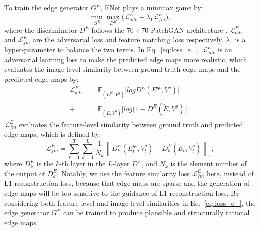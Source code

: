 To train the edge generator $G^E$, ENet plays a minimax game by:
\begin{equation}
	\label{eq:loss_e_}
	\min\limits_{G^E} \max \limits_{D^E} \big(\mathcal{L}^E_{adv}+\lambda_1 \mathcal{L}^E_{fm}\big),
\end{equation}
where the discriminator $D^E$ follows the $70\times 70$ PatchGAN architecture \cite{Isola_2017_CVPR}. 
$\mathcal{L}^E_{adv}$ and $\mathcal{L}^E_{fm}$ are the adversarial loss and feature matching loss respectively. 
$\lambda_1$ is a hyper-parameter to balance the two terms.
%
In Eq.~\eqref{eq:loss_e_}, $\mathcal{L}^E_{adv}$ is an adversarial learning loss to make the predicted edge maps more realistic, which evaluates the image-level similarity between ground truth edge maps and the predicted edge maps by:
\begin{equation} \label{eq:edge_adver}
	\begin{aligned} 
		\mathcal{L}^E_{adv}  =&\mathbb{E}_{({E}^{gt},{V}^{g})}\big[logD^E({E}^{gt},{V}^{g})\big]\\ 
		+&\mathbb{E}_{({\widetilde{E}},{V}^{g})}\big[log\big(1-D^E ( {\widetilde{E}},{V}^{g})\big)\big].
	\end{aligned}
\end{equation}
% 
$\mathcal{L}^E_{fm}$ evaluates the feature-level similarity between ground truth and predicted edge maps, which is defined by:
\begin{equation}
	\label{eq:edge_fm}
	\mathcal{L}^E_{fm}=\sum_{t=1}^T\sum_{k=1}^L{\frac{1}{N_k}\left\| D^E_k({E}_t^{gt},{V}_t^{g})- D^E_k({\widetilde{E}_t},{V}_t^{g})\right\|_1},
\end{equation}
where $D^E_k$ is the $k$-th layer in the $L$-layer $D^E$, and $N_k$ is the element number of the output of $D^E_k$.
{\color{blue}
Notably, we use the feature similarity loss $\mathcal{L}^E_{fm}$ here, instead of L1 reconstruction loss, because that edge maps are sparse and the generation of edge maps will be too sensitive to the guidance of L1 reconstruction loss.
}
By considering both feature-level and image-level similarities in Eq.~\eqref{eq:loss_e_}, the edge generator $G^E$ can be trained to produce plausible and structurally rational edge maps.

